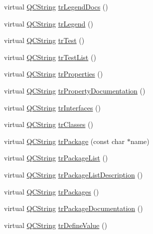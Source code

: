 \begin{DoxyCompactItemize}
\item 
virtual \hyperlink{class_q_c_string}{Q\+C\+String} \hyperlink{class_translator_norwegian_aa9efd8f4b10cd329e4958461ac7d833a}{tr\+Legend\+Docs} ()
\item 
virtual \hyperlink{class_q_c_string}{Q\+C\+String} \hyperlink{class_translator_norwegian_ad360060e3c275b75a2bec2f3be9fcc51}{tr\+Legend} ()
\item 
virtual \hyperlink{class_q_c_string}{Q\+C\+String} \hyperlink{class_translator_norwegian_aba6cffeb4e885992b737208fec03e753}{tr\+Test} ()
\item 
virtual \hyperlink{class_q_c_string}{Q\+C\+String} \hyperlink{class_translator_norwegian_ad5130914a116936a9248503ee9e6a140}{tr\+Test\+List} ()
\item 
virtual \hyperlink{class_q_c_string}{Q\+C\+String} \hyperlink{class_translator_norwegian_aa2d4c267e5ca84066b1cca221a8cb22d}{tr\+Properties} ()
\item 
virtual \hyperlink{class_q_c_string}{Q\+C\+String} \hyperlink{class_translator_norwegian_a0ead09cbf04a98fa9e95244ff8264bae}{tr\+Property\+Documentation} ()
\item 
virtual \hyperlink{class_q_c_string}{Q\+C\+String} \hyperlink{class_translator_norwegian_af6584d5199bcba69b0ae9d2000456159}{tr\+Interfaces} ()
\item 
virtual \hyperlink{class_q_c_string}{Q\+C\+String} \hyperlink{class_translator_norwegian_a6f5a448e25b026e9857c36c849d56451}{tr\+Classes} ()
\item 
virtual \hyperlink{class_q_c_string}{Q\+C\+String} \hyperlink{class_translator_norwegian_ac9c006ac458ddf2eaf91581ff71c4e38}{tr\+Package} (const char $\ast$name)
\item 
virtual \hyperlink{class_q_c_string}{Q\+C\+String} \hyperlink{class_translator_norwegian_a7bc92ccd5f87e67b3814041d1cea7494}{tr\+Package\+List} ()
\item 
virtual \hyperlink{class_q_c_string}{Q\+C\+String} \hyperlink{class_translator_norwegian_ae0077f95662dc4f9004d007905881e7a}{tr\+Package\+List\+Description} ()
\item 
virtual \hyperlink{class_q_c_string}{Q\+C\+String} \hyperlink{class_translator_norwegian_a274998ad1b62c49a131f7bd7a3d64e36}{tr\+Packages} ()
\item 
virtual \hyperlink{class_q_c_string}{Q\+C\+String} \hyperlink{class_translator_norwegian_a15329bbb12d3758100a967929612ed09}{tr\+Package\+Documentation} ()
\item 
virtual \hyperlink{class_q_c_string}{Q\+C\+String} \hyperlink{class_translator_norwegian_abbba5c7fcdb5c95a4f58ad017606e738}{tr\+Define\+Value} ()

\end{DoxyCompactItemize}
